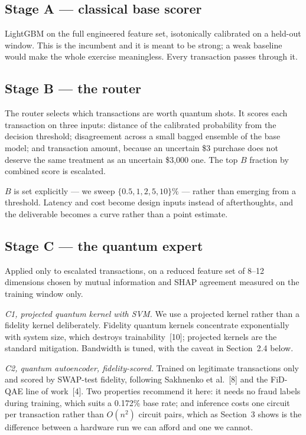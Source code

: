 \documentclass[10pt,a4paper]{article}
\begin{document}
\subsection*{Stage A --- classical base scorer}
LightGBM on the full engineered feature set, isotonically calibrated on a held-out window. This is the incumbent and it is meant to be strong; a weak baseline would make the whole exercise meaningless. Every transaction passes through it.

\subsection*{Stage B --- the router}
The router selects which transactions are worth quantum shots. It scores each transaction on three inputs: distance of the calibrated probability from the decision threshold; disagreement across a small bagged ensemble of the base model; and transaction amount, because an uncertain \$3 purchase does not deserve the same treatment as an uncertain \$3{,}000 one. The top $B$ fraction by combined score is escalated.

$B$ is set explicitly --- we sweep $\{0.5, 1, 2, 5, 10\}\%$ --- rather than emerging from a threshold. Latency and cost become design inputs instead of afterthoughts, and the deliverable becomes a curve rather than a point estimate.

\subsection*{Stage C --- the quantum expert}
Applied only to escalated transactions, on a reduced feature set of 8--12 dimensions chosen by mutual information and SHAP agreement measured on the training window only.

\emph{C1, projected quantum kernel with SVM.} We use a projected kernel rather than a fidelity kernel deliberately. Fidelity quantum kernels concentrate exponentially with system size, which destroys trainability~[10]; projected kernels are the standard mitigation. Bandwidth is tuned, with the caveat in Section~2.4 below.

\emph{C2, quantum autoencoder, fidelity-scored.} Trained on legitimate transactions only and scored by SWAP-test fidelity, following Sakhnenko et al.~[8] and the FiD-QAE line of work~[4]. Two properties recommend it here: it needs no fraud labels during training, which suits a 0.172\% base rate; and inference costs one circuit per transaction rather than $O(n^2)$ circuit pairs, which as Section~3 shows is the difference between a hardware run we can afford and one we cannot.
\end{document}
